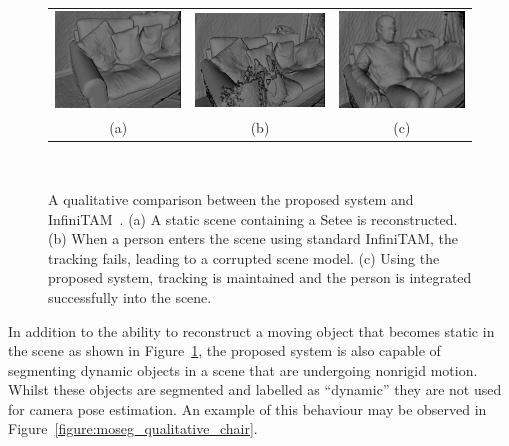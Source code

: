 \begin{figure}[!htbp]
  \centering
  \begin{tabular}{ccc}
    \includegraphics[height=.2\linewidth]{figures/moseg/original_sitting.png} &
    \includegraphics[height=.2\linewidth]{figures/moseg/infinitam_sitting.png} &
    \includegraphics[height=.2\linewidth]{figures/moseg/moseg_sitting.png}\\
    (a) & (b) & (c)
  \end{tabular}
  \caption[Motion Segmentation Qualitative Results I]
  {A qualitative comparison between the proposed system and InfiniTAM~\cite{Prisacariu2014}.
    (a) A static scene containing a Setee is reconstructed.
    (b) When a person enters the scene using standard InfiniTAM, the tracking
    fails, leading to a corrupted scene model.
    (c) Using the proposed system, tracking is maintained and the person is
    integrated successfully into the scene.}
~\label{figure:moseg_qualitative_setee}
\end{figure}

In addition to the ability to reconstruct a moving object that becomes static in
the scene as shown in Figure~\ref{figure:moseg_qualitative_setee}, the proposed
system is also capable of segmenting dynamic objects in a scene that are
undergoing nonrigid motion. Whilst these objects are segmented and labelled as
``dynamic'' they are not used for camera pose estimation. An example of this
behaviour may be observed in Figure~\ref{figure:moseg_qualitative_chair}.

